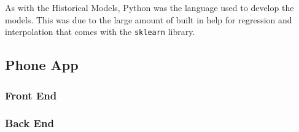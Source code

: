As with the Historical Models, Python was the language used to develop the models. This was due to the large amount of built in help for regression and interpolation that comes with the \texttt{sklearn} library. 

\subsection{Phone App}

\subsubsection{Front End}

\subsubsection{Back End}

\clearpage